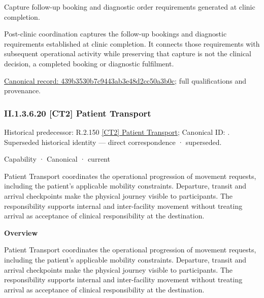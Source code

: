 Capture follow-up booking and diagnostic order requirements generated at clinic completion.



Post-clinic coordination captures the follow-up bookings and diagnostic requirements established at clinic completion. It connects those requirements with subsequent operational activity while preserving that capture is not the clinical decision, a completed booking or diagnostic fulfilment.


{\footnotesize \href{../../../../continuum/strategy/capability/feature/439b3530b7c9443ab3e48d2cc50a3b0c.md}{Canonical record: 439b3530b7c9443ab3e48d2cc50a3b0c}; full qualifications and provenance.}\par
\subsubsection*{II.1.3.6.20 [CT2] Patient Transport}
\label{navigation:II.1.3.6.20}

{\small Historical predecessor: R.2.150 \hyperref[element:e9c1a897884f4d758f5654b824364030]{[CT2] Patient Transport}; Canonical ID: \texttt{}. Superseded historical identity — direct correspondence · superseded.}\par
\label{element:6041d7c0cc5d4519aaea584bb4e6d365}
{\small Capability · Canonical · current}\par

Patient Transport coordinates the operational progression of movement requests, including the patient's applicable mobility constraints. Departure, transit and arrival checkpoints make the physical journey visible to participants. The responsibility supports internal and inter-facility movement without treating arrival as acceptance of clinical responsibility at the destination.



\textbf{Overview}



Patient Transport coordinates the operational progression of movement requests, including the patient's applicable mobility constraints. Departure, transit and arrival checkpoints make the physical journey visible to participants. The responsibility supports internal and inter-facility movement without treating arrival as acceptance of clinical responsibility at the destination.



